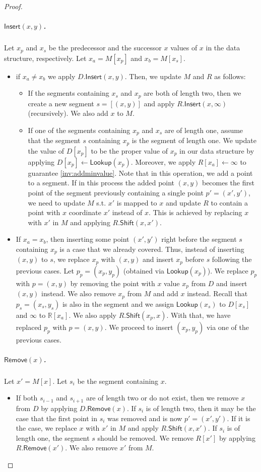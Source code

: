 \documentclass[a4paper,UKenglish,cleveref, autoref, thm-restate]{lipics-v2021}
\newcommand{\R}{\mathbb{R}}
\newcommand{\assign}{\leftarrow}
\newcommand{\ShiftOp}{\mathsf{Shift}}
\newcommand{\Insert}{\mathsf{Insert}}
\newcommand{\Remove}{\mathsf{Remove}}
\newcommand{\Lookup}{\mathsf{Lookup}}
\newcommand{\para}[1]{\vspace{-0.1in} \subparagraph*{#1}}
\begin{document}
\begin{proof}
\para{$\Insert(x,y)$.}
Let $x_p$ and $x_s$ be the predecessor and the successor $x$ values of $x$ in the data structure, respectively.
Let $x_a = M[x_p]$ and $x_b= M[x_s]$.
\begin{itemize}
    \item if $x_a\ne x_b$ 
    we apply $D.\Insert(x,y)$.
    Then, we update $M$ and $R$ as follows:
    \begin{itemize}
        \item If the segments containing $x_s$ and $x_p$ are both of length two, 
        then we create a new segment $s=[(x,y)]$ and apply $R.\Insert(x,\infty)$ (recursively).
        We also add $x$ to $M$.
        \item If one of the segments containing $x_p$ and $x_s$ are of length one, 
        assume that the segment $s$ containing $x_p$ is the segment of length one.
        We update the value of $D[x_{p}]$ to be the proper value of $x_p$ in our data structure by applying $D[x_{p}]\assign \Lookup(x_{p})$. 
        Moreover, we apply $R[x_a]\assign\infty$ to guarantee \cref{inv:addminvalue}.
        Note that in this operation, we add a point to a segment.
        If in this process the added point $(x,y)$ becomes the first point of the segment previously containing a single point $p'= (x',y')$, we need to update $M$ s.t. $x'$ is mapped to $x$ and update $R$ to contain a point with $x$ coordinate $x'$ instead of $x$.
        This is achieved by replacing $x$ with $x'$ in $M$ and applying $R.\ShiftOp(x,x')$.
    \end{itemize}
    \item If $x_a=x_b$, then inserting some point $(x',y')$ right before the segment $s$ containing $x_p$ is a case that we already covered.
    Thus, instead of inserting $(x,y)$ to $s$, we replace $x_p$ with $(x,y)$ and insert $x_p$ before $s$ following the previous cases.
    Let $p_p = (x_p,y_p)$ (obtained via $\Lookup(x_p)$). 
    We replace $p_p$ with $p=(x,y)$ by removing the point with $x$ value $x_p$ from $D$ and insert $(x,y)$ instead.
    We also remove $x_p$ from $M$ and add $x$ instead.
    Recall that $p_s = (x_s,y_s)$ is also in the segment 
    and we assign $\Lookup(x_{s})$ to $D[x_s]$ and $\infty$ to $\R[x_a]$.
    We also apply $R.\ShiftOp(x_p,x)$.
    With that, we have replaced $p_p$ with $p=(x,y)$.
    We proceed to insert $(x_p,y_p)$ via one of the previous cases.
\end{itemize}

\para{$\Remove(x)$.}
Let $x'=M[x]$. Let $s_{i}$ be the segment containing $x$. 
\begin{itemize}
    \item If both $s_{i-1}$ and $s_{i+1}$ are of length two or do not exist, then we remove $x$ from $D$ by applying $D.\Remove(x)$.
        If $s_{i}$ is of length two, then it may be the case that the first point in $s_{i}$ was removed and is now $p'=(x',y')$.
        If it is the case, we replace $x$ with $x'$ in $M$ and apply $R.\ShiftOp(x,x')$.
        If $s_{i}$ is of length one, the segment $s$ should be removed.
            We remove $R[x']$ by applying $R.\Remove(x')$.
            We also remove $x'$ from $M$.
    

\end{itemize}
\end{proof}
\end{document}
